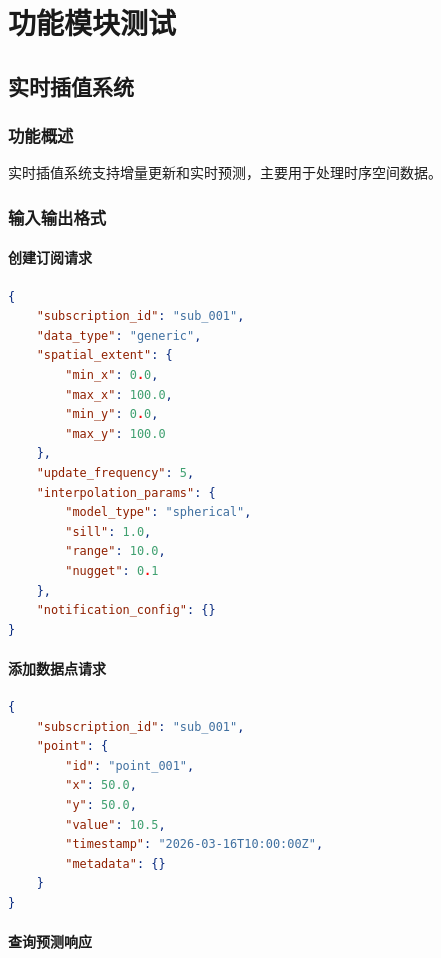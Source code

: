 \documentclass[12pt,a4paper,openany]{report}
\begin{document}
\chapter{功能模块测试}

\section{实时插值系统}

\subsection{功能概述}

实时插值系统支持增量更新和实时预测，主要用于处理时序空间数据。

\subsection{输入输出格式}

\subsubsection{创建订阅请求}

\begin{lstlisting}[language=JSON, caption=创建订阅请求]
{
    "subscription_id": "sub_001",
    "data_type": "generic",
    "spatial_extent": {
        "min_x": 0.0,
        "max_x": 100.0,
        "min_y": 0.0,
        "max_y": 100.0
    },
    "update_frequency": 5,
    "interpolation_params": {
        "model_type": "spherical",
        "sill": 1.0,
        "range": 10.0,
        "nugget": 0.1
    },
    "notification_config": {}
}
\end{lstlisting}

\subsubsection{添加数据点请求}

\begin{lstlisting}[language=JSON, caption=添加数据点请求]
{
    "subscription_id": "sub_001",
    "point": {
        "id": "point_001",
        "x": 50.0,
        "y": 50.0,
        "value": 10.5,
        "timestamp": "2026-03-16T10:00:00Z",
        "metadata": {}
    }
}
\end{lstlisting}

\subsubsection{查询预测响应}
\end{document}
